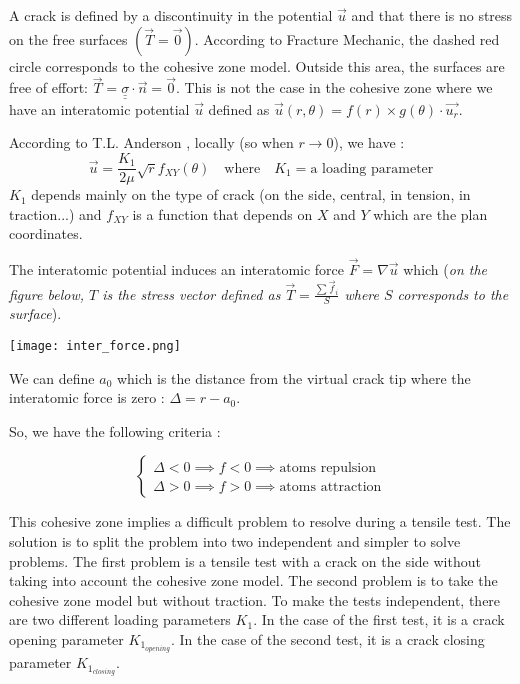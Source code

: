             A crack is defined by a discontinuity in the potential $\vec{u}$ and that there is no stress on the free surfaces $(\vec{T} = \vec{0})$. According to Fracture Mechanic, the dashed red circle corresponds to the \gls{cohesive zone} model. Outside this area, the surfaces are free of effort: $\vec{T} = \underline{\underline{\sigma}}\cdot\vec{n} = \vec{0}$. This is not the case in the \gls{cohesive zone} where we have an interatomic potential $\vec{u}$ defined as $\vec{u}(r,\theta) = f(r)\times g(\theta)\cdot\vec{u_r}$. \medskip
            
            According to T.L. Anderson \cite{2}, locally (so when $r\rightarrow 0$), we have :
            $$
            \vec{u} = \frac{K_1}{2\mu}\sqrt{r}f_{XY}(\theta) \quad\text{where}\quad K_1 = \text{a loading parameter}
            $$
            $K_1$ depends mainly on the type of crack (on the side, central, in tension, in traction...) and $f_{XY}$ is a function that depends on $X$ and $Y$ which are the plan coordinates.\medskip

            The interatomic potential induces an interatomic force $\vec{F} = \nabla \vec{u}$ which (\textit{on the figure below, $T$ is the stress vector defined as $\vec{T} = \frac{\sum\vec{f}_i}{S}$ where $S$ corresponds to the surface}). 

            \begin{center}
                \captionsetup{type=figure}
                \texttt{[image: inter\_force.png]}
            \end{center}
            
            We can define $a_0$ which is the distance from the virtual crack tip where the interatomic force is zero : $\Delta = r - a_0$. 
            
            So, we have the following criteria : 

            $$
            \left\lbrace\begin{array}{l}
                \Delta < 0 \implies f < 0 \implies \text{atoms repulsion}\\
                \Delta > 0 \implies f > 0 \implies \text{atoms attraction}
            \end{array}\right.
            $$
            \medskip

            This \gls{cohesive zone} implies a difficult problem to resolve during a tensile test. The solution is to split the problem into two independent and simpler to solve problems. The first problem is a tensile test with a crack on the side without taking into account the \gls{cohesive zone} model. The second problem is to take the \gls{cohesive zone} model but without traction. To make the tests independent, there are two different loading parameters $K_1$. In the case of the first test, it is a crack opening parameter $K_{1_{opening}}$. In the case of the second test, it is a crack closing parameter $K_{1_{closing}}$.

